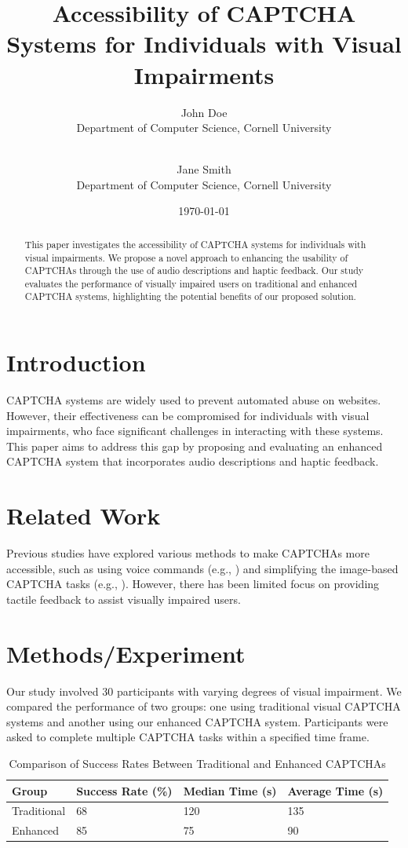 \documentclass{article}
\title{Accessibility of CAPTCHA Systems for Individuals with Visual Impairments}
\author{John Doe \\
        Department of Computer Science, Cornell University \\
        \email{johndoe@cornell.edu} \\
        \and Jane Smith \\
        Department of Computer Science, Cornell University \\
        \email{janesmith@cornell.edu}}
\date{\today}
\begin{document}
\maketitle

\begin{abstract}
This paper investigates the accessibility of CAPTCHA systems for individuals with visual impairments. We propose a novel approach to enhancing the usability of CAPTCHAs through the use of audio descriptions and haptic feedback. Our study evaluates the performance of visually impaired users on traditional and enhanced CAPTCHA systems, highlighting the potential benefits of our proposed solution.
\end{abstract}

\section{Introduction}
CAPTCHA systems are widely used to prevent automated abuse on websites. However, their effectiveness can be compromised for individuals with visual impairments, who face significant challenges in interacting with these systems. This paper aims to address this gap by proposing and evaluating an enhanced CAPTCHA system that incorporates audio descriptions and haptic feedback.

\section{Related Work}
Previous studies have explored various methods to make CAPTCHAs more accessible, such as using voice commands (e.g., \cite{voice_commands}) and simplifying the image-based CAPTCHA tasks (e.g., \cite{simplified_captchas}). However, there has been limited focus on providing tactile feedback to assist visually impaired users.

\section{Methods/Experiment}
Our study involved 30 participants with varying degrees of visual impairment. We compared the performance of two groups: one using traditional visual CAPTCHA systems and another using our enhanced CAPTCHA system. Participants were asked to complete multiple CAPTCHA tasks within a specified time frame.

\begin{table}[htbp]
\centering
\caption{Comparison of Success Rates Between Traditional and Enhanced CAPTCHAs}
\begin{tabular}{@{}llll@{}}
\toprule
\textbf{Group} & \textbf{Success Rate (\%)} & \textbf{Median Time (s)} & \textbf{Average Time (s)} \\ \midrule
Traditional   & 68                        & 120                      & 135                       \\
Enhanced       & 85                        & 75                       & 90                        \\ \bottomrule
\end{tabular}
\label{tab:success_rates}
\end{table}
\end{document}
